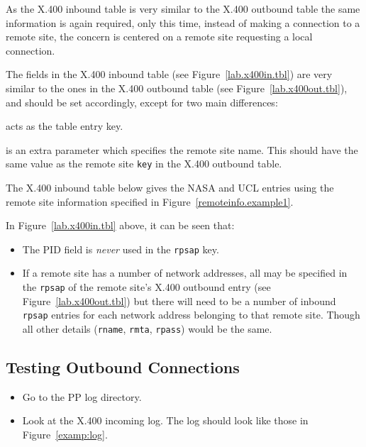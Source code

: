 As the X.400 inbound table is very similar to the X.400 outbound 
table the same information is again required,
only this time, instead of making a connection to a remote site,
the concern is centered on a remote site requesting a local connection. 

The fields in the X.400 inbound table (see
Figure~\ref{lab.x400in.tbl}) are very similar to the ones in the X.400
outbound table (see Figure~\ref{lab.x400out.tbl}), and should be set
accordingly, except for two main differences:

\begin {describe}
\item[\verb|rpsap|:] acts as the table entry key.
\item[\verb|rname|:] is an extra parameter which specifies the remote site name.
This should have the same value as the remote site \verb|key| in the 
X.400 outbound table.
\end{describe}

The X.400 inbound table below gives the NASA and UCL entries using the
remote site information specified in Figure~\ref{remoteinfo.example1}.


In Figure~\ref{lab.x400in.tbl} above, it can be seen that:

\begin{itemize} 
\item The PID field is {\em never} used in the \verb|rpsap| key.

\item If a remote site has a number of network addresses, 
all may be specified in the \verb|rpsap| of the remote site's X.400
outbound entry (see Figure~\ref{lab.x400out.tbl})  but there
will need to be a number of inbound
\verb|rpsap| entries for each network address belonging to that remote site.
Though all other details (\verb|rname|, \verb|rmta|, \verb|rpass|)
would be the same.
\end {itemize} 


\subsection {Testing Outbound Connections}

\begin{itemize}
\item Go to the PP log directory.
\item Look at the X.400 incoming log. The log should look like those
in Figure~\ref{examp:log}.
\end{itemize}

